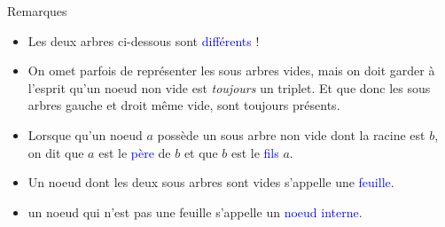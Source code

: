 \documentclass[10pt]{beamer}
\begin{document}
\begin{frame}[fragile]{\Ctitle}{\stitle}
	\begin{block}{Remarques}
		\begin{itemize}
			\item<1->{\small \textcolor{BrickRed}{\danger}} Les deux arbres ci-dessous sont \textcolor{blue}{différents} !\\
			 \quad \quad \quad
			 \quad \quad \quad
			\item<2-> On omet parfois de représenter les sous arbres vides, mais on doit garder à l'esprit qu'un noeud non vide est \textit{toujours} un triplet. Et que donc les sous arbres gauche et droit même vide, sont toujours présents.
			\item<3-> Lorsque qu'un noeud $a$ possède un sous arbre non vide dont la racine est $b$, on dit que $a$ est le \textcolor{blue}{père} de $b$ et que $b$ est le \textcolor{blue}{fils} $a$.
			\item<4-> Un noeud dont les deux sous arbres sont vides s'appelle une \textcolor{blue}{feuille}.
			\item<5-> un noeud qui n'est pas une feuille s'appelle un \textcolor{blue}{noeud interne}.
		\end{itemize}
	\end{block}
\end{frame}
\end{document}

